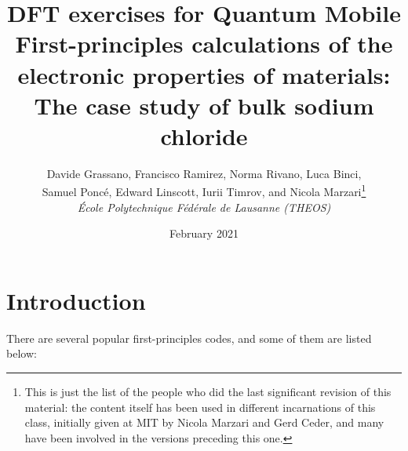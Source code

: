 \documentclass[12pt]{article}
\begin{document}
\title{
    {\bf DFT exercises for Quantum Mobile} \\
    First-principles calculations of the electronic properties of materials: The case study of bulk sodium chloride
}
\author{
    Davide Grassano,
    Francisco Ramirez,
    Norma Rivano,
    Luca Binci,\\
    Samuel Ponc\'e, 
    Edward Linscott, 
    Iurii Timrov,
    and Nicola Marzari\footnote{This is just the list of the people who did the last significant revision of this material: the content itself has been used in different
    incarnations of this class, initially given at MIT by Nicola Marzari and Gerd
    Ceder, and many have been involved in the versions preceding this one.}\\[4mm]
    {\it \'Ecole Polytechnique F\'ed\'erale de Lausanne (THEOS)}}
\date{February 2021}
  
\maketitle
\tableofcontents
\newpage


\section{Introduction}

    There are several popular first-principles codes, and some of them are listed below:
\end{document}
